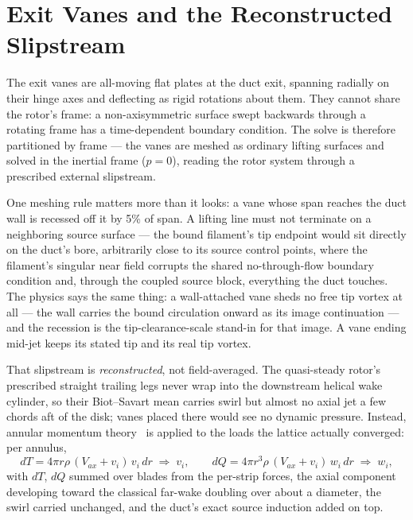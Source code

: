 \documentclass[]{aiaa-tc}%
\begin{document}
\section{Exit Vanes and the Reconstructed Slipstream}
\label{s:vanes}

The exit vanes are all-moving flat plates at the duct exit, spanning
radially on their hinge axes and deflecting as rigid rotations about
them. They cannot share the rotor's frame: a non-axisymmetric surface
swept backwards through a rotating frame has a time-dependent boundary
condition. The solve is therefore partitioned by frame --- the vanes
are meshed as ordinary lifting surfaces and solved in the inertial
frame ($p = 0$), reading the rotor system through a prescribed
external slipstream.

One meshing rule matters more than it looks: a vane whose span
reaches the duct wall is recessed off it by 5\% of span. A lifting
line must not terminate on a neighboring source surface --- the bound
filament's tip endpoint would sit directly on the duct's bore,
arbitrarily close to its source control points, where the filament's
singular near field corrupts the shared no-through-flow boundary
condition and, through the coupled source block, everything the duct
touches. The physics says the same thing: a wall-attached vane sheds
no free tip vortex at all --- the wall carries the bound circulation
onward as its image continuation --- and the recession is the
tip-clearance-scale stand-in for that image. A vane ending mid-jet
keeps its stated tip and its real tip vortex.

That slipstream is \emph{reconstructed}, not field-averaged. The
quasi-steady rotor's prescribed straight trailing legs never wrap into
the downstream helical wake cylinder, so their Biot--Savart mean
carries swirl but almost no axial jet a few chords aft of the disk;
vanes placed there would see no dynamic pressure. Instead, annular
momentum theory~\cite{glauert1935} is applied to the loads the
lattice actually converged: per annulus,
\begin{equation}
 \label{e:slipstream}
 dT = 4\pi r \rho\, (V_{ax} + v_i)\, v_i \, dr
 \;\Rightarrow\; v_i ,
 \qquad
 dQ = 4\pi r^3 \rho\, (V_{ax} + v_i)\, w_i \, dr
 \;\Rightarrow\; w_i ,
\end{equation}
with $dT$, $dQ$ summed over blades from the per-strip forces, the
axial component developing toward the classical far-wake doubling over
about a diameter, the swirl carried unchanged, and the duct's exact
source induction added on top.
\end{document}
